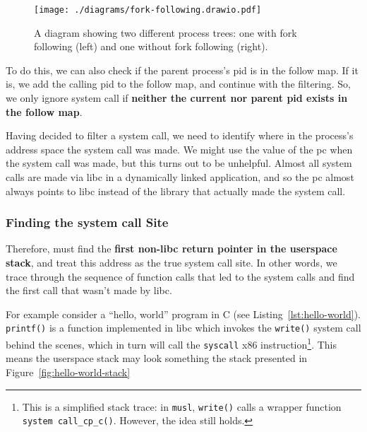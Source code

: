 \begin{figure}[ht]
    \centering
    \texttt{[image: ./diagrams/fork-following.drawio.pdf]} 
    \caption{A diagram showing two different process trees: one with fork
    following (left) and one without fork following (right).}
    \label{fig:fork-follow-process-tree}
\end{figure}


To do this, we can also check if the parent process's \ac{pid} is in the follow
map. If it is, we add the calling \ac{pid} to the follow map, and continue with
the filtering. So, we only ignore system call if \textbf{neither the current nor
parent \ac{pid} exists in the follow map}.

Having decided to filter a system call, we need to identify where in the process's
address space the system call was made. We might use the value of the \ac{pc} when
the system call was made, but this turns out to be unhelpful.
Almost all system calls are made via \ac{libc} in a dynamically linked 
application, and so the \ac{pc} almost always points to \ac{libc} instead of the
library that actually made the system call.

\subsubsection{Finding the system call Site}\label{subsubsec:find_syscall}

Therefore, \af must find the \textbf{first non-\ac{libc} return pointer in the
userspace stack}, and treat this address as the true system call site. In other
words, we trace through the sequence of function calls that led to the system
calls and find the first call that wasn't made by libc.

For example consider a ``hello, world'' program in C (see Listing~\ref{lst:hello-world}). \texttt{printf()} is a 
function implemented in \ac{libc} which invokes the \texttt{write()} system call
behind the scenes, which in turn will call the \texttt{syscall} x86
instruction\footnote{This is a simplified stack trace: in \texttt{musl},
\texttt{write()} calls a wrapper function \texttt{system call\_cp\_c()}. However,
the idea still holds.}. This means the userspace stack may look something the stack
presented in Figure~\ref{fig:hello-world-stack}

